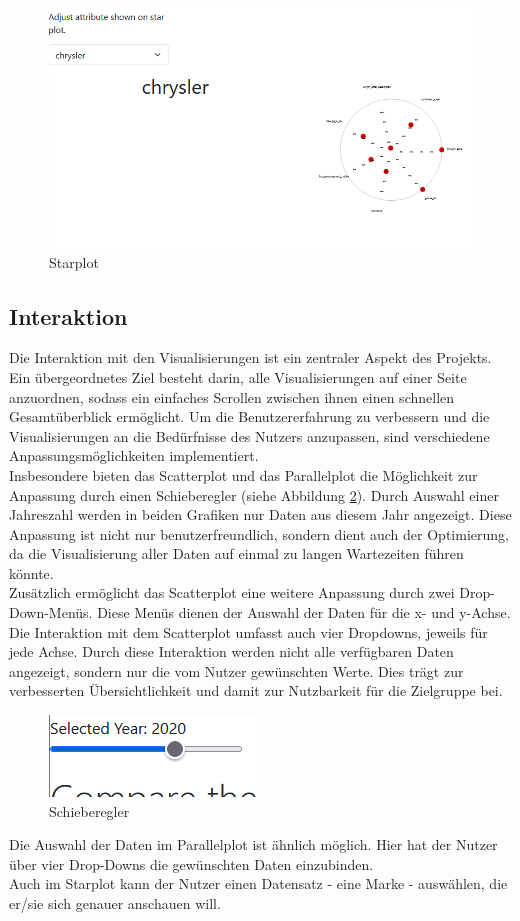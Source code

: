 \begin{figure}[H]
    \centering
    \includegraphics[width = \textwidth]{img/starplot.png}
    \caption{Starplot}
    \label{fig:scatter}
\end{figure}


\subsection{Interaktion}


Die Interaktion mit den Visualisierungen ist ein zentraler Aspekt des Projekts. Ein übergeordnetes Ziel besteht darin, alle Visualisierungen auf einer Seite anzuordnen, sodass ein einfaches Scrollen zwischen ihnen einen schnellen Gesamtüberblick ermöglicht. Um die Benutzererfahrung zu verbessern und die Visualisierungen an die Bedürfnisse des Nutzers anzupassen, sind verschiedene Anpassungsmöglichkeiten implementiert. \\

Insbesondere bieten das Scatterplot und das Parallelplot die Möglichkeit zur Anpassung durch einen Schieberegler (siehe Abbildung \ref{fig:schieber}). Durch Auswahl einer Jahreszahl werden in beiden Grafiken nur Daten aus diesem Jahr angezeigt. Diese Anpassung ist nicht nur benutzerfreundlich, sondern dient auch der Optimierung, da die Visualisierung aller Daten auf einmal zu langen Wartezeiten führen könnte. \\

Zusätzlich ermöglicht das Scatterplot eine weitere Anpassung durch zwei Drop-Down-Menüs. Diese Menüs dienen der Auswahl der Daten für die x- und y-Achse. Die Interaktion mit dem Scatterplot umfasst auch vier Dropdowns, jeweils für jede Achse. Durch diese Interaktion werden nicht alle verfügbaren Daten angezeigt, sondern nur die vom Nutzer gewünschten Werte. Dies trägt zur verbesserten Übersichtlichkeit und damit zur Nutzbarkeit für die Zielgruppe bei. \\
\begin{figure}[H]
    \centering
    \includegraphics{img/interaktion1.png}
    \caption{Schieberegler}
    \label{fig:schieber}
\end{figure}

Die Auswahl der Daten im Parallelplot ist ähnlich möglich. Hier hat der Nutzer über vier Drop-Downs die gewünschten Daten einzubinden. \\
Auch im Starplot kann der Nutzer einen Datensatz - eine Marke - auswählen, die er/sie sich genauer anschauen will. \\